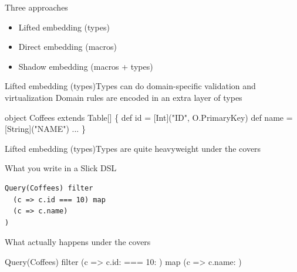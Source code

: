 \documentclass[compress,xcolor={usenames,dvipsnames,table}]{beamer}
\begin{document}
\begin{frame}{Three approaches}
  \begin{itemize}
    \item Lifted embedding (types)
    \item Direct embedding (macros)
    \item Shadow embedding (macros + types)
  \end{itemize}
\end{frame}

\begin{frame}[fragile]{Lifted embedding (types)}{Types can do domain-specific validation and virtualization}
  Domain rules are encoded in an extra layer of types
  \vspace{1em}

  \begin{semiverbatim}
object Coffees extends Table[\text{\color{blue}{(Int, String, ...)}}] \{
  def id = \text{\color{blue}{column}}[Int]("ID", O.PrimaryKey)
  def name = \text{\color{blue}{column}}[String]("NAME")
  ...
\}
  \end{semiverbatim}
\end{frame}

\begin{frame}[fragile]{Lifted embedding (types)}{Types are quite heavyweight under the covers}
  \vspace{1em}
  \begin{exampleblock}{What you write in a Slick DSL}
    \begin{verbatim}
Query(Coffees) filter
  (c => c.id === 10) map
  (c => c.name)
)
    \end{verbatim}
  \end{exampleblock}

  \begin{alertblock}{What actually happens under the covers}
    \begin{semiverbatim}
Query(Coffees) filter
  (c => c.id: \text{\color{blue}{Column[Int]}} === 10: \text{\color{blue}{Column[Int]}}) map
  (c => c.name: \text{\color{blue}{Column[String]}})
    \end{semiverbatim}
  \end{alertblock}

\end{frame}
\end{document}
